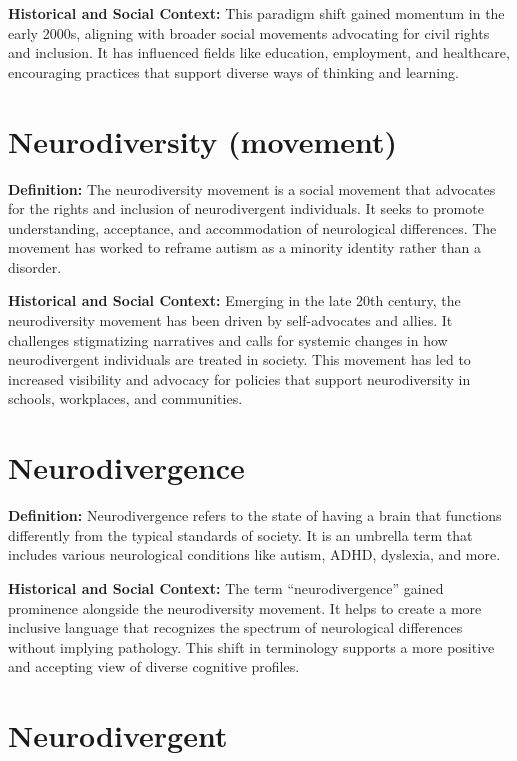 \documentclass[
  letterpaper,
  DIV=11,
  numbers=noendperiod]{scrreprt}
\begin{document}
\textbf{Historical and Social Context:} This paradigm shift gained
momentum in the early 2000s, aligning with broader social movements
advocating for civil rights and inclusion. It has influenced fields like
education, employment, and healthcare, encouraging practices that
support diverse ways of thinking and learning.

\hypertarget{neurodiversity-movement}{%
\section{Neurodiversity (movement)}\label{neurodiversity-movement}}

\textbf{Definition:} The neurodiversity movement is a social movement
that advocates for the rights and inclusion of neurodivergent
individuals. It seeks to promote understanding, acceptance, and
accommodation of neurological differences. The movement has worked to
reframe autism as a minority identity rather than a disorder.

\textbf{Historical and Social Context:} Emerging in the late 20th
century, the neurodiversity movement has been driven by self-advocates
and allies. It challenges stigmatizing narratives and calls for systemic
changes in how neurodivergent individuals are treated in society. This
movement has led to increased visibility and advocacy for policies that
support neurodiversity in schools, workplaces, and communities.

\hypertarget{neurodivergence}{%
\section{Neurodivergence}\label{neurodivergence}}

\textbf{Definition:} Neurodivergence refers to the state of having a
brain that functions differently from the typical standards of society.
It is an umbrella term that includes various neurological conditions
like autism, ADHD, dyslexia, and more.

\textbf{Historical and Social Context:} The term ``neurodivergence''
gained prominence alongside the neurodiversity movement. It helps to
create a more inclusive language that recognizes the spectrum of
neurological differences without implying pathology. This shift in
terminology supports a more positive and accepting view of diverse
cognitive profiles.

\hypertarget{neurodivergent}{%
\section{Neurodivergent}\label{neurodivergent}}
\end{document}
